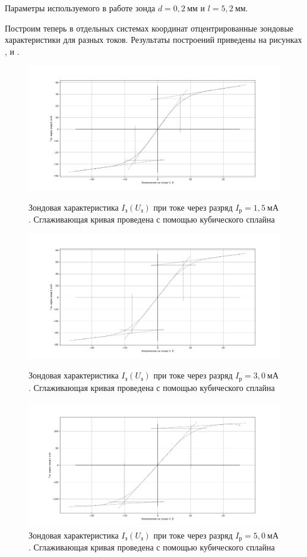 \documentclass[a4paper,10pt]{article}
\begin{document}
Параметры используемого в работе зонда $d=0,2~\text{мм}$ и $l=5,2~\text{мм}$.

Построим теперь в отдельных системах координат отцентрированные зондовые характеристики для разных токов. Результаты построений приведены на рисунках ,  и .

\begin{figure}[h]
	\centering
	\includegraphics[scale=0.28]{zoond1}
	\caption{Зондовая характеристика $I_{\text{з}}\left(U_{\text{з}}\right)$ при токе через разряд $I_{\text{р}}=1,5~\text{мА}$. Сглаживающая кривая проведена с помощью кубического сплайна} \label{zoond1}
	\centering
	\includegraphics[scale=0.28]{zoond2}
	\caption{Зондовая характеристика $I_{\text{з}}\left(U_{\text{з}}\right)$ при токе через разряд $I_{\text{р}}=3,0~\text{мА}$. Сглаживающая кривая проведена с помощью кубического сплайна} \label{zoond2}
	\centering
	\includegraphics[scale=0.28]{zoond3}
	\caption{Зондовая характеристика $I_{\text{з}}\left(U_{\text{з}}\right)$ при токе через разряд $I_{\text{р}}=5,0~\text{мА}$. Сглаживающая кривая проведена с помощью кубического сплайна} \label{zoond3}
\end{figure}
 
\end{document}
